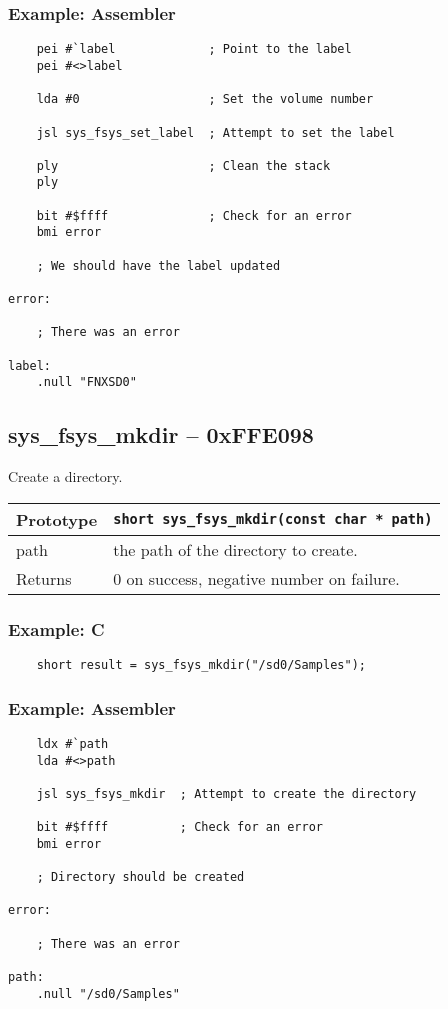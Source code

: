 \subsubsection*{Example: Assembler}
\begin{verbatim}
    pei #`label             ; Point to the label
    pei #<>label

    lda #0                  ; Set the volume number

    jsl sys_fsys_set_label  ; Attempt to set the label

    ply                     ; Clean the stack
    ply

    bit #$ffff              ; Check for an error
    bmi error

    ; We should have the label updated

error:

    ; There was an error

label:
    .null "FNXSD0"
\end{verbatim}

\subsection*{sys\_fsys\_mkdir -- 0xFFE098}
Create a directory.

\bigskip

\begin{tabular}{|l||l|} \hline
Prototype & \lstinline!short sys_fsys_mkdir(const char * path)! \\ \hline
path & the path of the directory to create. \\ \hline
Returns & 0 on success, negative number on failure. \\ \hline
\end{tabular}

\subsubsection*{Example: C}
\begin{lstlisting}
    short result = sys_fsys_mkdir("/sd0/Samples");
\end{lstlisting}

\subsubsection*{Example: Assembler}
\begin{verbatim}
    ldx #`path
    lda #<>path

    jsl sys_fsys_mkdir  ; Attempt to create the directory

    bit #$ffff          ; Check for an error
    bmi error

    ; Directory should be created

error:

    ; There was an error

path:
    .null "/sd0/Samples"
\end{verbatim}


